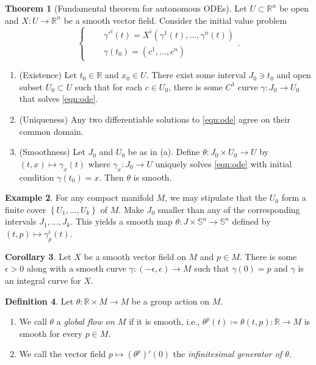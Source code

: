 \documentclass[10pt,letterpaper,cm]{nupset}
\theoremstyle{definition}
\newtheorem{definition}{Definition}[subsection]
\newtheorem{exmp}[definition]{Example}
\theoremstyle{theorem}
\newtheorem{theorem}[definition]{Theorem}
\newtheorem{corollary}[definition]{Corollary}
\theoremstyle{remark}
\newcommand{\R}{\mathbb R}
\renewcommand{\S}{\mathbb S}
\newcommand{\1}{\mathbf{1}}
\newcommand{\0}{\vec 0}
\begin{document}
\begin{theorem}[Fundamental theorem for autonomous ODEs]
Let $U\subset \R^n$ be open and $X: U \to \R^n$ be a smooth vector field.  Consider the initial value problem
\begin{equation}
 \begin{cases}  \label{eqn:ode} 
 & \gamma'^i(t)  = X^i\left(\gamma^1(t), \ldots, \gamma^n(t)\right) \\ \quad  & \gamma(t_0)  =(c^1, \ldots, c^n) 
 \end{cases}.
\end{equation}
\begin{enumerate}[label=(\alph*)]
\item (Existence)  Let $t_0 \in \R$ and $x_0\in U$. There exist some interval $J_0 \ni t_0$ and open subset $U_0 \subset U$ such that for each $c\in U_0$, there is some $C^1$ curve $\gamma : J_0 \to U_0$ that solves  \cref{eqn:ode}.
\item (Uniqueness)  Any two differentiable solutions to  \cref{eqn:ode} agree on their common domain.
\item (Smoothness) Let $J_0$ and $U_0$ be as in (a). Define $\theta : J_0 \times U_0 \to U$ by $\left(t, x\right) \mapsto \gamma_x(t)$ where $\gamma_x : J_0 \to U$ uniquely solves  \cref{eqn:ode} with initial condition $\gamma(t_0) = x$. Then $\theta$ is smooth.
\end{enumerate}
\end{theorem}

\begin{exmp}
For any compact manifold $M$, we may stipulate that the $U_0$ form a finite cover $\left\{U_1, \ldots, U_k\right\}$ of $M$. Make $J_0$ smaller than any of the corresponding intervals $J_1, \ldots, J_k$. This yields a smooth map $\theta : J \times \S^n \to \S^n$ defined by $\left(t, p\right) \mapsto \gamma_p^i(t)$.
\end{exmp}

\begin{corollary}
Let $X$ be a smooth vector field on $M$ and $p\in M$. There is some $\epsilon >0$ along with a smooth curve $\gamma : ({-\epsilon} , \epsilon) \to M$ such that $\gamma(0)= p$ and $\gamma$ is an integral curve for $X$.
\end{corollary}

\begin{definition}
Let $\theta : \R \times M \to M$ be a group action on $M$. 
\begin{enumerate}
\item We call $\theta$ a \textit{global flow on $M$} if it is smooth, i.e., $\theta^p(t)\coloneqq  \theta(t, p) : \R \to M$ is smooth for every $p\in M$.
\item We call the vector field $p\mapsto  (\theta^p)'(0)$  the \textit{infinitesimal generator of $\theta$}.
\end{enumerate}
\end{definition}
\end{document}
